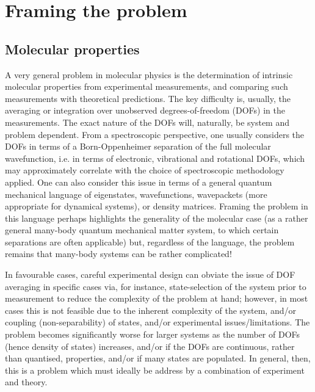 \section{Framing the problem}

\subsection{Molecular properties}
A very general problem in molecular physics is the determination of intrinsic molecular properties from experimental measurements, and comparing such measurements with theoretical predictions. The key difficulty is, usually, the averaging or integration over unobserved degrees-of-freedom (DOFs) in the measurements. The exact nature of the DOFs will, naturally, be system and problem dependent. From a spectroscopic perspective, one usually considers the DOFs in terms of a Born-Oppenheimer separation of the full molecular wavefunction, i.e. in terms of electronic, vibrational and rotational DOFs, which may approximately correlate with the choice of spectroscopic methodology applied. One can also consider this issue in terms of a general quantum mechanical language of eigenstates, wavefunctions, wavepackets (more appropriate for dynamical systems), or density matrices. Framing the problem in this language perhaps highlights the generality of the molecular case (as a rather general many-body quantum mechanical matter system, to which certain separations are often applicable) but, regardless of the language, the problem remains that many-body systems can be rather complicated!

In favourable cases, careful experimental design can obviate the issue of DOF averaging in specific cases via, for instance, state-selection of the system prior to measurement to reduce the complexity of the problem at hand; however, in most cases this is not feasible due to the inherent complexity of the system, and/or coupling (non-separability) of states, and/or experimental issues/limitations. The problem becomes significantly worse for larger systems as the number of DOFs (hence density of states) increases, and/or if the DOFs are continuous, rather than quantised, properties, and/or if many states are populated. In general, then, this is a problem which must ideally be address by a combination of experiment and theory.